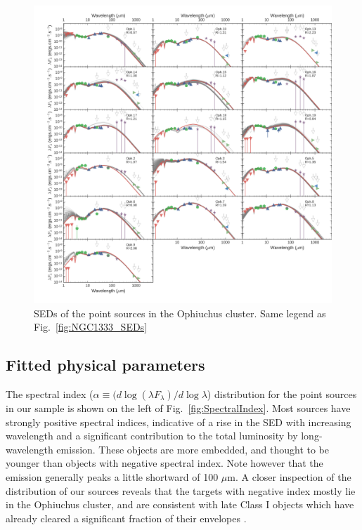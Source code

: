 \begin{figure}[!h]
\begin{center}
\includegraphics[width=\textwidth]{Figures/Oph_SEDs.png}
\caption[Ophiuchus SEDs]{SEDs of the point sources in the Ophiuchus cluster. Same legend as Fig.~\ref{fig:NGC1333_SEDs}}
\label{fig:Oph_SEDs}
\end{center}
\end{figure}


\subsection{Fitted physical parameters}

The spectral index ($\alpha \equiv (d\log(\lambda F_\lambda)/d\log\lambda$) distribution for the point sources in our sample is shown on the left of Fig.~\ref{fig:SpectralIndex}. Most sources have strongly positive spectral indices, indicative of a rise in the SED with increasing wavelength and a significant contribution to the total luminosity by long-wavelength emission. These objects are more embedded, and thought to be younger than objects with negative spectral index. Note however that the emission generally
peaks a little shortward of 100 $\mu$m. A closer inspection of the distribution of our sources reveals that the targets with negative index mostly lie in the Ophiuchus cluster, and are consistent with late Class I objects which have already cleared a significant fraction of their envelopes \citep{Jorgensen:2008gz}. 

